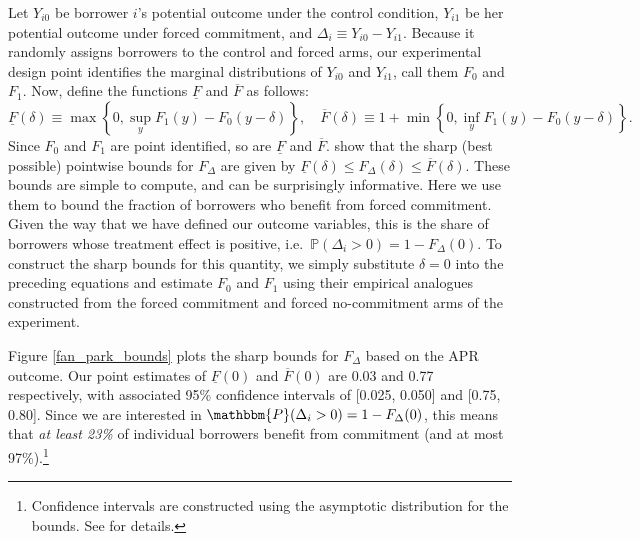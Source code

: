 \documentclass[ecta,nameyear,final]{econsocart}
\begin{document}
Let $Y_{i0}$ be borrower $i$'s potential outcome under the control condition, $Y_{i1}$ be her potential outcome under forced commitment, and $\Delta_i \equiv Y_{i0} - Y_{i1}$.
Because it randomly assigns borrowers to the control and forced arms, our experimental design point identifies the marginal distributions of $Y_{i0}$ and $Y_{i1}$, call them $F_0$ and $F_1$.
Now, define the functions $\underline{F}$ and $\overline{F}$ as follows:
\[
\underline{F}(\delta) \equiv \max \left\{0, \sup_y F_1(y) - F_0(y - \delta)  \right\}, \quad
\overline{F}(\delta) \equiv 1 + \min \left\{0, \inf_y F_1(y) - F_0(y-\delta) \right\}.
\]
Since $F_0$ and $F_1$ are point identified, so are $\underline{F}$ and $\overline{F}$.
\cite{fan2010sharp} show that the sharp (best possible) pointwise bounds for $F_\Delta$ are given by $\underline{F}(\delta) \leq F_\Delta(\delta) \leq \overline{F}(\delta)$.
These bounds are simple to compute, and can be surprisingly informative. 
Here we use them to bound the fraction of borrowers who benefit from forced commitment. 
Given the way that we have defined our outcome variables, this is the share of borrowers whose treatment effect is positive, i.e.\ $\mathbb{P}(\Delta_i > 0) = 1 - F_\Delta(0)$. 
To construct the sharp bounds for this quantity, we simply substitute $\delta = 0$ into the preceding equations and estimate $F_0$ and $F_1$ using their empirical analogues constructed from the forced commitment and forced no-commitment arms of the experiment.

Figure \ref{fan_park_bounds} plots the sharp bounds for $F_{\Delta}$ based on the APR outcome. Our point estimates of $\underline{F}(0)$ and $\overline{F}(0)$  are 0.03 and 0.77 respectively, with associated 95\% confidence intervals of [0.025, 0.050] and [0.75, 0.80]. Since we are interested in $\mathbbm{P}(\Delta_i >0) = 1 - F_\Delta(0)$, this means that \textit{at least 23\%} of individual borrowers benefit from commitment (and at most 97\%).\footnote{Confidence intervals are constructed using the asymptotic distribution for the bounds. See \cite{fan2010sharp} for details.}
\end{document}
